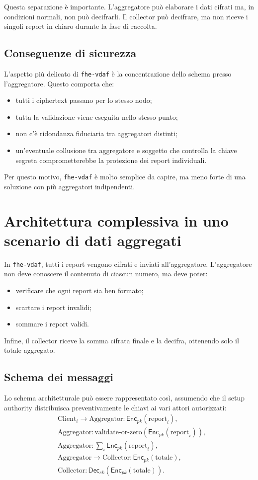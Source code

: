 Questa separazione \`e importante. L'aggregatore pu\`o elaborare i dati cifrati ma, in condizioni normali, non pu\`o decifrarli. Il collector pu\`o decifrare, ma non riceve i singoli report in chiaro durante la fase di raccolta.

\subsection{Conseguenze di sicurezza}
L'aspetto pi\`u delicato di \texttt{fhe-vdaf} \`e la concentrazione dello schema presso l'aggregatore. Questo comporta che:
\begin{itemize}
  \item tutti i ciphertext passano per lo stesso nodo;
  \item tutta la validazione viene eseguita nello stesso punto;
  \item non c'\`e ridondanza fiduciaria tra aggregatori distinti;
  \item un'eventuale collusione tra aggregatore e soggetto che controlla la chiave segreta comprometterebbe la protezione dei report individuali.
\end{itemize}

Per questo motivo, \texttt{fhe-vdaf} \`e molto semplice da capire, ma meno forte di una soluzione con pi\`u aggregatori indipendenti.

\section{Architettura complessiva in uno scenario di dati aggregati}
In \texttt{fhe-vdaf}, tutti i report vengono cifrati e inviati all'aggregatore. L'aggregatore non deve conoscere il contenuto di ciascun numero, ma deve poter:
\begin{itemize}
  \item verificare che ogni report sia ben formato;
  \item scartare i report invalidi;
  \item sommare i report validi.
\end{itemize}

Infine, il collector riceve la somma cifrata finale e la decifra, ottenendo solo il totale aggregato.

\subsection{Schema dei messaggi}
Lo schema architetturale pu\`o essere rappresentato cos\`i, assumendo che il setup authority distribuisca preventivamente le chiavi ai vari attori autorizzati:
\begin{align}
&\text{Client}_i \longrightarrow \text{Aggregator}: \mathsf{Enc}_{pk}(\text{report}_i), \\
&\text{Aggregator}: \text{validate-or-zero}(\mathsf{Enc}_{pk}(\text{report}_i)), \\
&\text{Aggregator}: \sum_i \mathsf{Enc}_{pk}(\text{report}_i), \\
&\text{Aggregator} \longrightarrow \text{Collector}: \mathsf{Enc}_{pk}(\text{totale}), \\
&\text{Collector}: \mathsf{Dec}_{sk}(\mathsf{Enc}_{pk}(\text{totale})).
\end{align}


